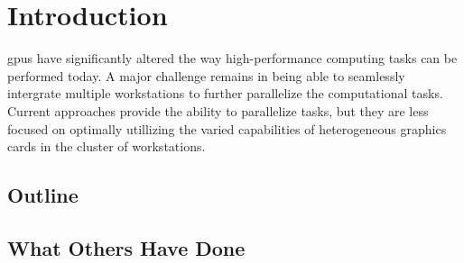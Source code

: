 \section{Introduction}

\Glspl{gpu} have significantly altered the way high-performance computing tasks
can be performed today. A major challenge remains in being able to seamlessly
intergrate multiple workstations to further parallelize the computational
tasks. Current approaches provide the ability to parallelize tasks, but they
are less focused on optimally utillizing the varied capabilities of
heterogeneous graphics cards in the cluster of workstations.\\

\subsection{Outline}

\subsection{What Others Have Done}
